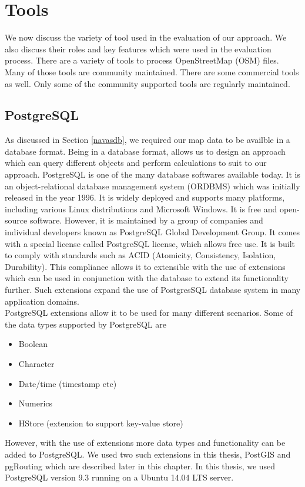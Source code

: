\section{Tools}\label{tools}
We now discuss the variety of tool used in the evaluation of our approach. We also discuss their roles and key features which were used in the evaluation process. There are a variety of tools to process OpenStreetMap (OSM) files. Many of those tools are community maintained. There are some commercial tools as well. Only some of the community supported tools are regularly maintained. 

\subsection{PostgreSQL}\label{postgres}
As discussed in Section \ref{navasdb}, we required our map data to be availble in a database format. Being in a database format, allows us to design an approach which can query different objects and perform calculations to suit to our approach. PostgreSQL \cite{postgresql} is one of the many database softwares available today. It is an object-relational database management system (ORDBMS) which was initially released in the year 1996. It is widely deployed and supports many platforms, including various Linux distributions and Microsoft Windows. It is free and open-source software. However, it is maintained by a group of companies and individual developers known as PostgreSQL Global Development Group. It comes with a special license called PostgreSQL license, which allows free use. It is built to comply with standards such as ACID (Atomicity, Consistency, Isolation, Durability). This compliance allows it to extensible with the use of extensions which can be used in conjunction with the database to extend its functionality further. Such extensions expand the use of PostgresSQL database system in many application domains.
\\

PostgreSQL extensions allow it to be used for many different scenarios. Some of the data types supported by PostgreSQL are \begin{itemize}
\item Boolean
\item Character
\item Date/time (timestamp etc)
\item Numerics
\item HStore (extension to support key-value store)
\end{itemize} 
However, with the use of extensions more data types and functionality can be added to PostgreSQL. We used two such extensions in this thesis, PostGIS and pgRouting which are described later in this chapter. In this thesis, we used PostgreSQL version 9.3 running on a Ubuntu 14.04 LTS server.
